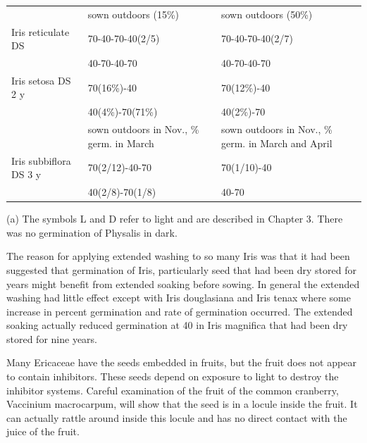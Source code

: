 \begin{table}[h!]
\begin{tabular}{|l|p{4cm}|p{4cm}|}
                       & sown outdoors (15\%) & sown outdoors (50\%)      \\
Iris reticulate DS     & 70-40-70-40(2/5)     & 70-40-70-40(2/7)      \\
                       & 40-70-40-70      & 40-70-40-70      \\
Iris setosa DS 2 y     & 70(16\%)-40      & 70(12\%)-40      \\
                       & 40(4\%)-70(71\%) & 40(2\%)-70       \\
            & sown outdoors in Nov., \newline 97\% germ. in March & sown outdoors in Nov., \newline 87\% germ. in March and April     \\
Iris subbiflora DS 3 y & 70(2/12)-40-70  & 70(1/10)-40       \\
                       & 40(2/8)-70(1/8) & 40-70             \\
\hline
\end{tabular}

(a) The symbols L and D refer to light and
are described in Chapter 3. There was no germination of Physalis in dark.
\label{table:wash}
\end{table}

The reason for applying extended washing to so many Iris was that it had been
suggested that germination of Iris, particularly seed that had been dry stored for years
might benefit from extended soaking before sowing. In general the extended washing
had little effect except with Iris douglasiana and Iris tenax where some increase in
percent germination and rate of germination occurred. The extended soaking actually
reduced germination at 40 in Iris magnifica that had been dry stored for nine years.

Many Ericaceae have the seeds embedded in fruits, but the fruit does not
appear to contain inhibitors. These seeds depend on exposure to light to destroy the
inhibitor systems. Careful examination of the fruit of the common cranberry, Vaccinium
macrocarpum, will show that the seed is in a locule inside the fruit. It can actually rattle
around inside this locule and has no direct contact with the juice of the fruit.

